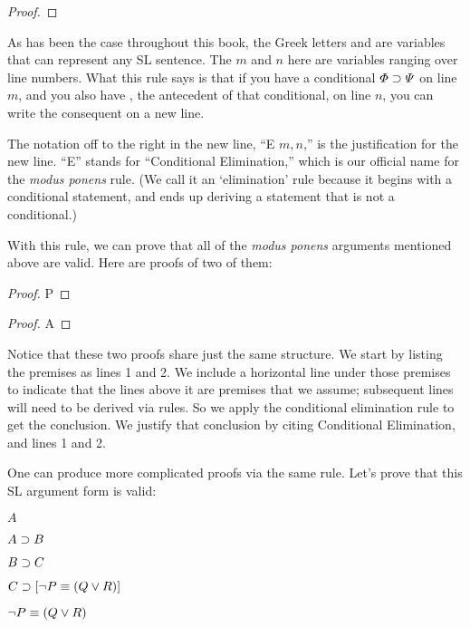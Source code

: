 \begin{proof}
	\metaA{}
	\metaB{} 
\end{proof}

As has been the case throughout this book, the Greek letters \metaA{} and \metaB{} are variables that can represent any SL sentence. The $m$ and $n$ here are variables ranging over line numbers. What this rule says is that if you have a conditional $\varPhi{}\supset\varPsi{}$ on line $m$, and you also have \metaA{}, the antecedent of that conditional, on line $n$, you can write the consequent \metaB{} on a new line.

The notation off to the right in the new line, ``\eif E $m, n$,'' is the justification for the new line. ``\eif E'' stands for ``Conditional Elimination,'' which is our official name for the \emph{modus ponens} rule. (We call it an `elimination' rule because it begins with a conditional statement, and ends up deriving a statement that is not a conditional.)

With this rule, we can prove that all of the \emph{modus ponens} arguments mentioned above are valid. Here are proofs of two of them:


\begin{multicols}{2}

\begin{proof}
	P
	 
\end{proof}


\begin{proof}
	A 
\end{proof}

\end{multicols}

Notice that these two proofs share just the same structure. We start by listing the premises as lines 1 and 2. We include a horizontal line under those premises to indicate that the lines above it are premises that we assume; subsequent lines will need to be derived via rules. So we apply the conditional elimination rule to get the conclusion. We justify that conclusion by citing Conditional Elimination, and lines 1 and 2.

One can produce more complicated proofs via the same rule. Let's prove that this SL argument form is valid:

\begin{earg}

\item[] $A$
\item[] $A \supset B$
\item[] $B \supset C$
\item[] $C \supset [\neg P \equiv (Q \vee R)]$
\item[\therefore] $\neg P \equiv (Q \vee R)$
\end{earg}

